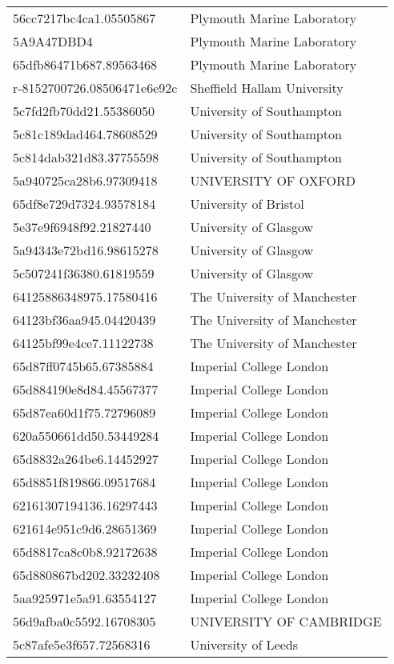 \begin{tabular}{ll}
56cc7217bc4ca1.05505867 & Plymouth Marine Laboratory \\
5A9A47DBD4 & Plymouth Marine Laboratory \\
65dfb86471b687.89563468 & Plymouth Marine Laboratory \\
r-8152700726.08506471e6e92c & Sheffield Hallam University \\
5c7fd2fb70dd21.55386050 & University of Southampton \\
5c81c189dad464.78608529 & University of Southampton \\
5c814dab321d83.37755598 & University of Southampton \\
5a940725ca28b6.97309418 & UNIVERSITY OF OXFORD \\
65df8e729d7324.93578184 & University of Bristol \\
5e37e9f6948f92.21827440 & University of Glasgow \\
5a94343e72bd16.98615278 & University of Glasgow \\
5c507241f36380.61819559 & University of Glasgow \\
64125886348975.17580416 & The University of Manchester \\
64123bf36aa945.04420439 & The University of Manchester \\
64125bf99e4ce7.11122738 & The University of Manchester \\
65d87ff0745b65.67385884 & Imperial College London \\
65d884190e8d84.45567377 & Imperial College London \\
65d87ea60d1f75.72796089 & Imperial College London \\
620a550661dd50.53449284 & Imperial College London \\
65d8832a264be6.14452927 & Imperial College London \\
65d8851f819866.09517684 & Imperial College London \\
62161307194136.16297443 & Imperial College London \\
621614e951c9d6.28651369 & Imperial College London \\
65d8817ca8c0b8.92172638 & Imperial College London \\
65d880867bd202.33232408 & Imperial College London \\
5aa925971e5a91.63554127 & Imperial College London \\
56d9afba0c5592.16708305 & UNIVERSITY OF CAMBRIDGE \\
5c87afe5e3f657.72568316 & University of Leeds \\

\end{tabular}

